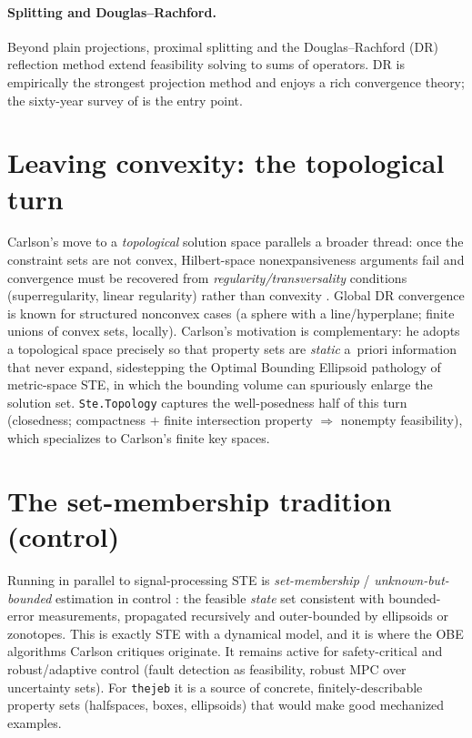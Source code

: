 \documentclass[11pt]{article}
\begin{document}
\paragraph{Splitting and Douglas--Rachford.} Beyond plain projections,
proximal splitting \citep{combettes2011proximal} and the
Douglas--Rachford (DR) reflection method extend feasibility solving to
sums of operators. DR is empirically the strongest projection method and
enjoys a rich convergence theory; the sixty-year survey of
\citet{lindstrom2021} is the entry point.

\section{Leaving convexity: the topological turn}
Carlson's move to a \emph{topological} solution space \citep{carlson2012}
parallels a broader thread: once the constraint sets are not convex,
Hilbert-space nonexpansiveness arguments fail and convergence must be
recovered from \emph{regularity/transversality} conditions
(superregularity, linear regularity) rather than convexity
\citep{lindstrom2021}. Global DR convergence is known for structured
nonconvex cases (a sphere with a line/hyperplane; finite unions of convex
sets, locally). Carlson's motivation is complementary: he adopts a
topological space precisely so that property sets are \emph{static}
a~priori information that never expand, sidestepping the Optimal Bounding
Ellipsoid pathology of metric-space STE, in which the bounding volume can
spuriously enlarge the solution set. \texttt{Ste.Topology} captures the
well-posedness half of this turn (closedness; compactness $+$ finite
intersection property $\Rightarrow$ nonempty feasibility), which
specializes to Carlson's finite key spaces.

\section{The set-membership tradition (control)}
Running in parallel to signal-processing STE is \emph{set-membership} /
\emph{unknown-but-bounded} estimation in control
\citep{schweppe1968,deller1989}: the feasible \emph{state} set consistent
with bounded-error measurements, propagated recursively and outer-bounded
by ellipsoids or zonotopes. This is exactly STE with a dynamical model,
and it is where the OBE algorithms Carlson critiques originate. It remains
active for safety-critical and robust/adaptive control (fault detection
as feasibility, robust MPC over uncertainty sets). For \texttt{thejeb} it
is a source of concrete, finitely-describable property sets (halfspaces,
boxes, ellipsoids) that would make good mechanized examples.
\end{document}
